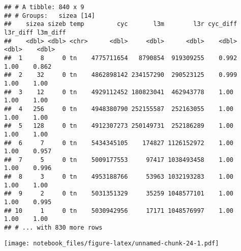 \documentclass[
]{article}
\newenvironment{Shaded}{\begin{snugshade}}{\end{snugshade}}
\newcommand{\CommentTok}[1]{\textcolor[rgb]{0.56,0.35,0.01}{\textit{#1}}}
\newcommand{\DataTypeTok}[1]{\textcolor[rgb]{0.13,0.29,0.53}{#1}}
\newcommand{\DecValTok}[1]{\textcolor[rgb]{0.00,0.00,0.81}{#1}}
\newcommand{\KeywordTok}[1]{\textcolor[rgb]{0.13,0.29,0.53}{\textbf{#1}}}
\newcommand{\NormalTok}[1]{#1}
\newcommand{\OperatorTok}[1]{\textcolor[rgb]{0.81,0.36,0.00}{\textbf{#1}}}
\newcommand{\StringTok}[1]{\textcolor[rgb]{0.31,0.60,0.02}{#1}}
\begin{document}
\begin{verbatim}
## # A tibble: 840 x 9
## # Groups:   sizea [14]
##    sizea sizeb temp         cyc       l3m        l3r cyc_diff l3r_diff l3m_diff
##    <dbl> <dbl> <chr>      <dbl>     <dbl>      <dbl>    <dbl>    <dbl>    <dbl>
##  1     8     0 tn    4775711654   8790854  919309255    0.992     1.00    0.862
##  2    32     0 tn    4862898142 234157290  290523125    0.999     1.00    1.00 
##  3    12     0 tn    4929112452 180823041  462943778    1.00      1.00    1.00 
##  4   256     0 tn    4948380790 252155587  252163055    1.00      1.00    1.00 
##  5   128     0 tn    4912307273 250149731  252186289    1.00      1.00    1.00 
##  6     7     0 tn    5434345105    174827 1126152972    1.00      1.00    0.957
##  7     5     0 tn    5009177553     97417 1038493458    1.00      1.00    0.996
##  8     3     0 tn    4953188766     53963 1032193283    1.00      1.00    1.00 
##  9     2     0 tn    5031351329     35259 1048577101    1.00      1.00    0.995
## 10     1     0 tn    5030942956     17171 1048576997    1.00      1.00    1.00 
## # ... with 830 more rows
\end{verbatim}

\begin{Shaded}
\end{Shaded}

\texttt{[image: notebook\_files/figure-latex/unnamed-chunk-24-1.pdf]}
\end{document}
